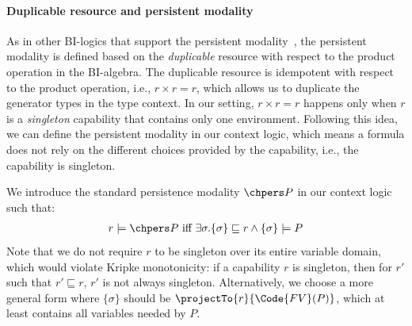\paragraph{Duplicable resource and persistent modality} As in other BI-logics that support the persistent modality~\cite{Iris}, the persistent modality is defined based on the \emph{duplicable} resource with respect to the product operation in the BI-algebra. The duplicable resource is idempotent with respect to the product operation, i.e., $r \times r = r$, which allows us to duplicate the generator types in the type context.
In our setting, $r \times r = r$ happens only when $r$ is a \emph{singleton} capability that contains only one environment. Following this idea, we can define the persistent modality in our context logic, which means a formula does not rely on the different choices provided by the capability, i.e., the capability is singleton.

\begin{definition} We introduce the standard persistence modality $\chpers P$ in our context logic such that:
  \begin{align*}
    r \models \chpers P \text{ iff } \exists \sigma. \{\sigma\} \sqsubseteq r \land \{\sigma\} \models P
  \end{align*}\noindent
  Note that we do not require $r$ to be singleton over its entire variable domain, which would violate Kripke monotonicity: if a capability $r$ is singleton, then for $r'$ such that $r' \sqsubseteq r$, $r'$ is not always singleton. Alternatively, we choose a more general form where $\{\sigma\}$ should be $\projectTo{r}{\Code{FV}(P)}$, which at least contains all variables needed by $P$.
\end{definition}

